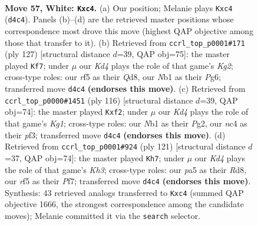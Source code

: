 \documentclass[11pt]{article}
\begin{document}
\clearpage

\begin{figure}[p]\centering
\begin{subfigure}{0.46\textwidth}\centering
\resizebox{\linewidth}{!}{%
\newchessgame
\chessboard[
  setfen={8/2k4p/8/p4r2/2nK4/4q3/4P3/1N6 w - - 1 57},
  showmover=false,
  pgfstyle=straightmove, color=movearrow, markmove={d4-c4}
]}
\caption{}
\end{subfigure}\hfill
\begin{subfigure}{0.46\textwidth}\centering
\resizebox{\linewidth}{!}{%
\newchessgame
\chessboard[
  setfen={3q4/6k1/6pQ/8/6N1/3P2K1/8/8 b - - 13 64},
  showmover=false,
  pgfstyle=straightmove, color=movearrow, markmove={g7-f7}
]}
\caption{}
\end{subfigure}
\\[4pt]
\begin{subfigure}{0.46\textwidth}\centering
\resizebox{\linewidth}{!}{%
\newchessgame
\chessboard[
  setfen={R7/3n1k2/6p1/3p4/8/5p2/5qP1/6K1 w - - 0 59},
  showmover=false,
  pgfstyle=straightmove, color=movearrow, markmove={g1-f2}
]}
\caption{}
\end{subfigure}\hfill
\begin{subfigure}{0.46\textwidth}\centering
\resizebox{\linewidth}{!}{%
\newchessgame
\chessboard[
  setfen={3r4/5p2/q3p2k/6Q1/5P2/1P6/4N3/7K b - - 1 61},
  showmover=false,
  pgfstyle=straightmove, color=movearrow, markmove={h6-h7}
]}
\caption{}
\end{subfigure}
\caption{\textbf{Move 57, White: \texttt{Kxc4}.} (a) Our position; Melanie plays \texttt{Kxc4} (\texttt{d4c4}). Panels (b)--(d) are the retrieved master positions whose correspondence most drove this move (highest QAP objective among those that transfer to it). (b) Retrieved from \texttt{ccrl\_top\_p0001\#171} (ply 127) [structural distance $d$=39, QAP obj=75]: the master played \texttt{Kf7}; under $\mu$ our \emph{Kd4} plays the role of that game's \emph{Kg2}; cross-type roles: our \emph{r}f5 as their \emph{Q}d8, our \emph{N}b1 as their \emph{P}g6; transferred move \texttt{d4c4} \textbf{(endorses this move)}. (c) Retrieved from \texttt{ccrl\_top\_p0000\#1451} (ply 116) [structural distance $d$=39, QAP obj=74]: the master played \texttt{Kxf2}; under $\mu$ our \emph{Kd4} plays the role of that game's \emph{Kg1}; cross-type roles: our \emph{N}b1 as their \emph{P}g2, our \emph{n}c4 as their \emph{p}f3; transferred move \texttt{d4c4} \textbf{(endorses this move)}. (d) Retrieved from \texttt{ccrl\_top\_p0001\#924} (ply 121) [structural distance $d$=37, QAP obj=74]: the master played \texttt{Kh7}; under $\mu$ our \emph{Kd4} plays the role of that game's \emph{Kh3}; cross-type roles: our \emph{p}a5 as their \emph{R}d8, our \emph{r}f5 as their \emph{P}f7; transferred move \texttt{d4c4} \textbf{(endorses this move)}. Synthesis: 43 retrieved analogs transferred to \texttt{Kxc4} (summed QAP objective 1666, the strongest correspondence among the candidate moves); Melanie committed it via the \texttt{search} selector.}
\label{fig:thought-m112}
\end{figure}
\end{document}
